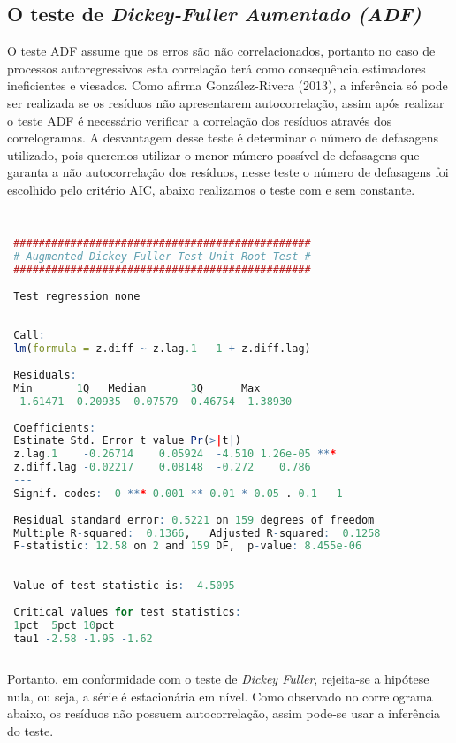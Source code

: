 \documentclass[a4paper,12pt,oneside,titlepage]{article}
\begin{document}
\subsection*{O teste de \textit{Dickey-Fuller Aumentado (ADF)}}

O teste ADF assume que os erros são não correlacionados,
portanto no caso de processos autoregressivos esta correlação terá
como consequência estimadores ineficientes e viesados. Como afirma
González-Rivera (2013), a inferência só pode ser realizada se os resíduos
não apresentarem autocorrelação, assim após realizar o teste ADF é
necessário verificar a correlação dos resíduos através dos
correlogramas. A desvantagem desse teste é determinar o número de
defasagens utilizado, pois queremos utilizar o menor número possível
de defasagens que garanta a não autocorrelação dos resíduos, nesse
teste o número de defasagens foi escolhido pelo critério AIC, abaixo
realizamos o teste com e sem constante.
 	
 	
 
 \begin{lstlisting}[language=R,caption={ADF}]
 
 
 ############################################### 
 # Augmented Dickey-Fuller Test Unit Root Test # 
 ############################################### 
 
 Test regression none 
 
 
 Call:
 lm(formula = z.diff ~ z.lag.1 - 1 + z.diff.lag)
 
 Residuals:
 Min       1Q   Median       3Q      Max 
 -1.61471 -0.20935  0.07579  0.46754  1.38930 
 
 Coefficients:
 Estimate Std. Error t value Pr(>|t|)    
 z.lag.1    -0.26714    0.05924  -4.510 1.26e-05 ***
 z.diff.lag -0.02217    0.08148  -0.272    0.786    
 ---
 Signif. codes:  0 *** 0.001 ** 0.01 * 0.05 . 0.1   1
 
 Residual standard error: 0.5221 on 159 degrees of freedom
 Multiple R-squared:  0.1366,	Adjusted R-squared:  0.1258 
 F-statistic: 12.58 on 2 and 159 DF,  p-value: 8.455e-06
 
 
 Value of test-statistic is: -4.5095 
 
 Critical values for test statistics: 
 1pct  5pct 10pct
 tau1 -2.58 -1.95 -1.62
 
 \end{lstlisting}
 
 
Portanto, em conformidade com o teste de \textit{Dickey Fuller}, rejeita-se
a hipótese nula, ou seja, a série é estacionária em nível. Como
observado no correlograma abaixo, os resíduos não possuem
autocorrelação, assim pode-se usar a inferência do teste.
\end{document}

